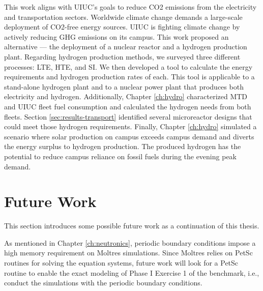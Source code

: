 This work aligns with UIUC's goals to reduce \gls{CO2} emissions from the electricity and transportation sectors.
Worldwide climate change demands a large-scale deployment of \gls{CO2}-free energy sources.
UIUC is fighting climate change by actively reducing GHG emissions on its campus.
This work proposed an alternative --- the deployment of a nuclear reactor and a hydrogen production plant.
Regarding hydrogen production methods, we surveyed three different processes: LTE, HTE, and SI.
We then developed a tool to calculate the energy requirements and hydrogen production rates of each.
This tool is applicable to a stand-alone hydrogen plant and to a nuclear power plant that produces both electricity and hydrogen.
Additionally, Chapter \ref{ch:hydro} characterized MTD and UIUC fleet fuel consumption and calculated the hydrogen needs from both fleets.
Section \ref{sec:results-transport} identified several microreactor designs that could meet those hydrogen requirements.
Finally, Chapter \ref{ch:hydro} simulated a scenario where solar production on campus exceeds campus demand and diverts the energy surplus to hydrogen production.
The produced hydrogen has the potential to reduce campus reliance on fossil fuels during the evening peak demand.

\section{Future Work}
\label{sec:futwork}

This section introduces some possible future work as a continuation of this thesis.

As mentioned in Chapter \ref{ch:neutronics}, periodic boundary conditions impose a high memory requirement on Moltres simulations.
Since Moltres relies on PetSc routines for solving the equation systems, future work will look for a PetSc routine to enable the exact modeling of Phase I Exercise 1 of the benchmark, i.e., conduct the simulations with the periodic boundary conditions.


